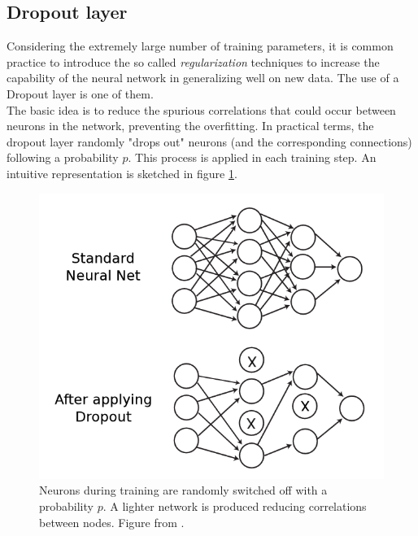 \subsection*{Dropout layer}
Considering the extremely large number of training parameters, it is common practice to introduce the so called \textit{regularization} techniques to increase the capability of the neural network in generalizing well on new data. The use of a Dropout layer is one of them.\\
The basic idea is to reduce the spurious correlations that could occur between neurons in the network, preventing the overfitting. In practical terms, the dropout layer randomly "drops out" neurons (and the corresponding connections) following a probability $p$. This process is applied in each training step. An intuitive representation is sketched in figure \ref{fig:Drop}.

\begin{figure}
	\centering
	\includegraphics[width=.6\textwidth]{IMG/Cap6/Dropout.png}
	\caption{Neurons during training are randomly switched off with a probability $p$. A lighter network is produced reducing correlations between nodes. Figure from \cite{ML4ph}.}
	\label{fig:Drop}
\end{figure}

